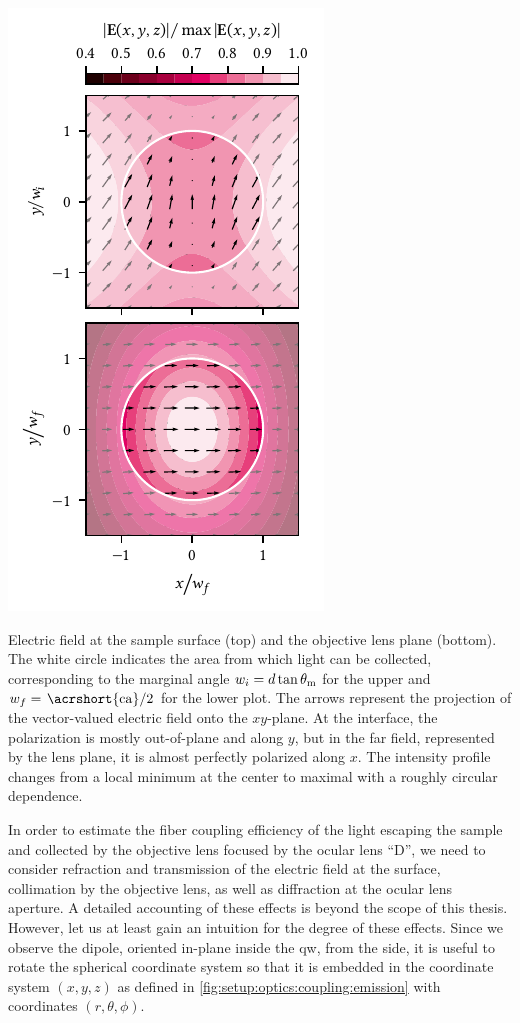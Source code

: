 \begin{marginfigure}
    \centering
    \includegraphics{img/pdf/setup/modes_2d}
    \caption[]{
        Electric field at the sample surface (top) and the objective lens plane (bottom).
        The white circle indicates the area from which light can be collected, corresponding to the marginal angle $w_i = d\tan\theta_{\mathrm{m}}$ for the upper and $w_f = \flatfrac{\mr{\acrshort{ca}}}{2}$ for the lower plot.
        The arrows represent the projection of the vector-valued electric field onto the $xy$-plane.
        At the interface, the polarization is mostly out-of-plane and along $y$, but in the far field, represented by the lens plane, it is almost perfectly polarized along $x$.
        The intensity profile changes from a local minimum at the center to maximal with a roughly circular dependence.
    }
    \label{fig:setup:optics:coupling:modes_2d}
\end{marginfigure}

In order to estimate the fiber coupling efficiency of the light escaping the sample and collected by the objective lens focused by the ocular lens \enquote{D}, we need to consider refraction and transmission of the electric field at the surface, collimation by the objective lens, as well as diffraction at the ocular lens aperture.
A detailed accounting of these effects is beyond the scope of this thesis.
However, let us at least gain an intuition for the degree of these effects.
Since we observe the dipole, oriented in-plane inside the \gls{qw}, from the side, it is useful to rotate the spherical coordinate system so that it is embedded in the coordinate system $(x, y, z)$ as defined in \cref{fig:setup:optics:coupling:emission} with coordinates $(r, \theta, \phi)$.

